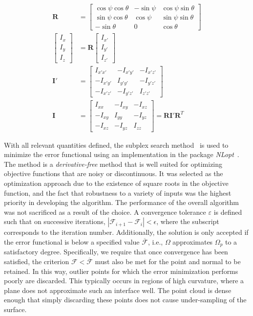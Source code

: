 \begin{align}
\bm{R} &= \left[\begin{array} {ccc} {\cos\psi\cos\theta} & {-\sin\psi} & {\cos\psi\sin\theta}\\ {\sin\psi\cos\theta} & {\cos\psi} & {\sin\psi\sin\theta} \\
{-\sin\theta} & {0} & {\cos\theta}\end{array} \right] \\
\left[\begin{array} {ccc} {I_x} \\ {I_y} \\ {I_z} \end{array} \right] &= \bm{R} \left[\begin{array} {ccc} {I_{x'}} \\ {I_{y'}} \\ {I_{z'}} \end{array} \right]\\
\bm{I}' &= \left[\begin{array} {ccc} {I_{x'x'}} & {-I_{x'y'}} & {-I_{x'z'}}\\ {-I_{x'y'}} & {I_{y'y'}} & {-I_{y'z'}} \\ -{I_{x'z'}} & {-I_{y'z'}} & {I_{z'z'}} \end{array} \right] \\
\bm{I} &= \left[\begin{array} {ccc} {I_{xx}} & {-I_{xy}} & {-I_{xz}}\\ {-I_{xy}} & {I_{yy}} & {-I_{yz}} \\ -{I_{xz}} & {-I_{yz}} & {I_{zz}} \end{array} \right] = \bm{R}\bm{I}'\mathbf{R}^T
\end{align}

With all relevant quantities defined, the subplex search method~\cite{rowan} is used to minimize the error functional using an implementation in the package \textit{NLopt}~\cite{nlo}. The method is a \textit{derivative-free} method that is well suited for optimizing objective functions that are noisy or discontinuous. It was selected as the optimization approach due to the existence of square roots in the objective function, and the fact that robustness to a variety of inputs was the highest priority in developing the algorithm. The performance of the overall algorithm was not sacrificed as a result of the choice. A convergence tolerance $\varepsilon$ is defined such that on successive iterations, $\left| \mathcal{F}_{i+1} - \mathcal{F}_{i}\right| < \epsilon$, where the subscript corresponds to the iteration number. Additionally, the solution is only accepted if the error functional is below a specified value $\overline{\mathcal{F}}$, i.e., $\Omega$ approximates $\Omega_p$ to a satisfactory degree. Specifically, we require that once convergence has been satisfied, the criterion $\mathcal{F} < \overline{\mathcal{F}}$ must also be met for the point and normal to be retained. In this way, outlier points for which the error minimization performs poorly are discarded. This typically occurs in regions of high curvature, where a plane does not approximate such an interface well. The point cloud is dense enough that simply discarding these points does not cause under-sampling of the surface.

